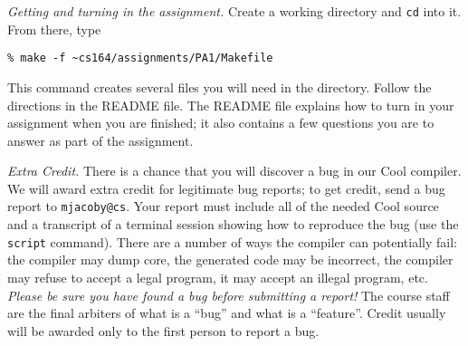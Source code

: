 {\em Getting and turning in the assignment.} 
Create a working directory and {\tt cd} into it.  From there, type
\begin{verbatim}
% make -f ~cs164/assignments/PA1/Makefile
\end{verbatim}
This command creates several files you will need in the directory.
Follow the directions in the README file.  The README file explains how to
turn in your assignment when you are finished; it also contains a few questions
you are to answer as part of the assignment.

{\em Extra Credit.} There is a chance that you will discover a bug in
our Cool compiler.  We will award extra credit for legitimate bug
reports; to get credit, send a bug report to {\tt mjacoby@cs}.  Your
report must include all of the needed Cool source and a transcript of
a terminal session showing how to reproduce the bug (use the {\tt
script} command).  There are a number of ways the compiler can
potentially fail: the compiler may dump core, the generated code may
be incorrect, the compiler may refuse to accept a legal program, it
may accept an illegal program, etc.  {\em Please be sure you have
found a bug before submitting a report!} The course staff are the
final arbiters of what is a ``bug'' and what is a ``feature''.  Credit
usually will be awarded only to the first person to report a bug.




